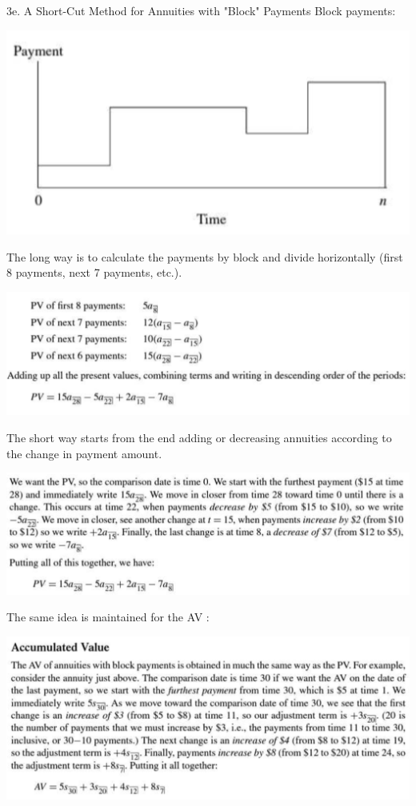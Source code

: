 \begin{CHPT_SUMM_AUTO}[label = {L.-3e}]{3e. A Short-Cut Method for Annuities with "Block" Payments}
Block payments:
\begin{center}
	\includegraphics[scale=0.4]{img/deferred-annuities-blocks.png}
\end{center}

The long way is to calculate the payments by block and divide horizontally (first 8 payments, next 7 payments, etc.).
\begin{center}
	\includegraphics[scale=0.4]{img/deferred-annuities-blocks-long.png}
\end{center}
The short way starts from the end adding or decreasing annuities according to the change in payment amount.
\begin{center}
	\includegraphics[scale=0.4]{img/deferred-annuities-blocks-short.png}
\end{center}

The same idea is maintained for the AV :
\begin{center}
	\includegraphics[scale=0.4]{img/deferred-annuities-blocks-AV.png}
\end{center}
\end{CHPT_SUMM_AUTO}


